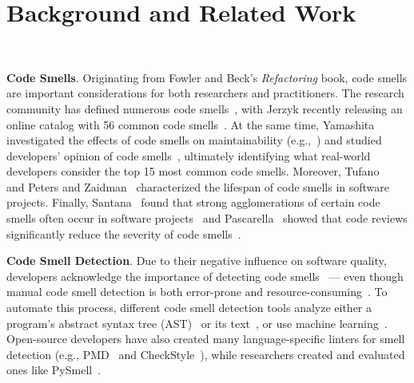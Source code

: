 \vspace*{-1em}

\section{Background and Related Work}~\label{sec:background}

\vspace*{-1em}


{\bf Code Smells}. Originating from Fowler and Beck's \textit{Refactoring}
book, code smells are important considerations for both researchers and
practitioners. The research community has defined numerous code
smells~\cite{Pysmell,SQLAntipatterns,CleanCode,RefactoringWorkbook}, with
Jerzyk recently releasing an online catalog with 56 common code
smells~\cite{Jerzyk2023}. At the same time, Yamashita investigated the effects
of code smells on maintainability (e.g.,~\cite{6392174, 6405287}) and studied
developers' opinion of code smells~\cite{developersCare}, ultimately
identifying what real-world developers consider the top 15 most common code
smells. Moreover, Tufano~\etal{}~\cite{whenandwhy} and Peters and
Zaidman~\cite{lifespan} characterized the lifespan of code smells in software
projects. Finally, Santana~\etal{} found that strong agglomerations of certain
code smells often occur in software projects~\cite{Santana} and
Pascarella~\etal{} showed that code reviews significantly reduce the severity
of code smells~\cite{Pascarella}.




{\bf Code Smell Detection}. Due to their negative influence on software
quality, developers acknowledge the importance of detecting code
smells~\cite{developersCare} --- even though manual code smell detection is
both error-prone and resource-consuming~\cite{DetectingDefectsInObject}.
%
To automate this process, different code smell detection tools analyze either a
program's abstract syntax tree (AST)~\cite{Lenarduzzi2023} or its
text~\cite{Palomba}, or use machine learning~\cite{ML}.
%
Open-source developers have also created many language-specific linters for
smell detection (e.g., PMD~\cite{PMD} and CheckStyle~\cite{CheckStyle}), while
researchers created and evaluated ones like PySmell~\cite{Pysmell}.

